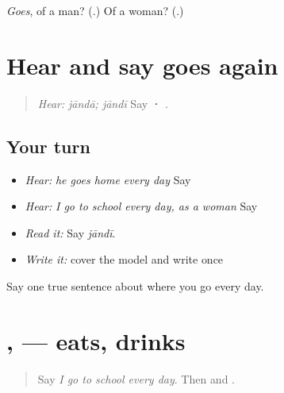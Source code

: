 \begin{tcolorbox}[breakable,colback=teal!4,colframe=teal!35!black,title={Before you move on}]
\emph{Goes}, of a man? (\textbf{}.) Of a woman? (\textbf{}.)
\end{tcolorbox}
\section[\texorpdfstring{\pa{ਜਾਂਦਾ} · \pa{ਜਾਂਦੀ} (jāndā · jāndī)}{ਜਾਂਦਾ · ਜਾਂਦੀ (jāndā · jāndī)}]{Hear and say goes again}

\label{lesson:PA-C211-janda-review}



\begin{quote}
\emph{Hear:} \emph{jāndā; jāndī} Say \textbf{ · }.
\end{quote}

\subsection*{Your turn}
\begin{itemize}
\raggedright
  \item \emph{Hear:} \emph{he goes home every day} Say \textbf{    }
  \item \emph{Hear:} \emph{I go to school every day, as a woman} Say \textbf{    }
  \item \emph{Read it:} \textbf{} Say \emph{jāndī}.
  \item \emph{Write it:} cover the model and write \textbf{} once
\end{itemize}

\begin{tcolorbox}[breakable,colback=teal!4,colframe=teal!35!black,title={Before you move on}]
Say one true sentence about where you go every day.
\end{tcolorbox}
\section[\texorpdfstring{\pa{ਖਾਂਦਾ} · \pa{ਪੀਂਦਾ} (khāndā · pīndā)}{ਖਾਂਦਾ · ਪੀਂਦਾ (khāndā · pīndā)}]{,  — eats, drinks}

\label{lesson:PA-C211-khanda-pinda}



\begin{quote}
Say \emph{I go to school every day}. Then \textbf{} and \textbf{}.
\end{quote}

